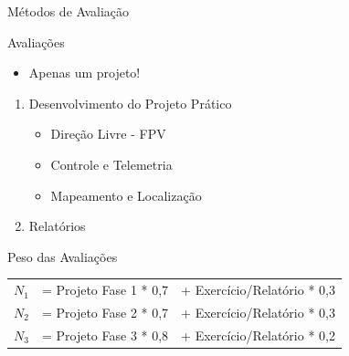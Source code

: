 \documentclass{beamer}
\begin{document}
\begin{frame}{Métodos de Avaliação}
	\begin{block}{Avaliações}
		\begin{itemize}
			\item Apenas um projeto!
		\end{itemize}
		\begin{enumerate}
			\item Desenvolvimento do Projeto Prático
			      \begin{itemize}
				      \item Direção Livre - FPV
				      \item Controle e Telemetria
				      \item Mapeamento e Localização
			      \end{itemize}
			\item Relatórios
		\end{enumerate}
	\end{block}
	\begin{block}{Peso das Avaliações}
		\begin{tabular}{lll}
			\hline
			$N_1$ & = Projeto Fase 1 * 0,7 & + Exercício/Relatório * 0,3 \\
			$N_2$ & = Projeto Fase 2 * 0,7 & + Exercício/Relatório * 0,3 \\
			$N_3$ & = Projeto Fase 3 * 0,8 & + Exercício/Relatório * 0,2 \\
			\hline
		\end{tabular}
	\end{block}
\end{frame}

\begin{frame}
	
\end{frame}

% 	
\end{document}
